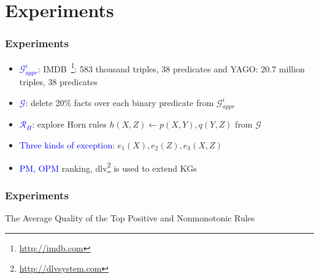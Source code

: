 \documentclass{beamer}
\newcommand{\bl}[1]{\textcolor{blue}{#1}}
\def\cG{\ensuremath{\mathcal{G}}}
\def\cR{\ensuremath{\mathcal{R}}}
\newcommand{\mi}[1]{\ensuremath{\mathit{#1}}}
\begin{document}
\section{Experiments}
\begin{frame}\frametitle{Experiments}
\begin{itemize}
\item \bl{$\cG^i_{\mi{appr}}$}: IMDB~\footnote{\url{http://imdb.com}}: 583 thousand triples, 38 predicates and YAGO: 20.7 million triples, 38 predicates

\medskip

\item \bl{$\cG$}: delete 20\% facts over each binary predicate from $\cG^i_{\mi{appr}}$
\medskip

\item \bl{$\cR_H$}: explore Horn rules $\mi{h(X,Z)\leftarrow p(X,Y),q(Y,Z)}$ from $\cG$
\medskip

\item \bl{Three kinds of exception}: $\mi{e_1(X),e_2(Z),e_3(X,Z)}$
\medskip

\item \bl{PM, OPM} ranking, dlv\footnote{\url{http://dlvsystem.com}} is used to extend KGs
\end{itemize}

\end{frame}

\begin{frame}\frametitle{Experiments}

\begin{table}[ht]
\centering
\footnotesize
\renewcommand*{\arraystretch}{1.07}
\centering

\caption{The Average Quality of the Top Positive and Nonmonotonic Rules}
\label{tab:rules_quality}
\end{table}

\end{frame}
\end{document}

